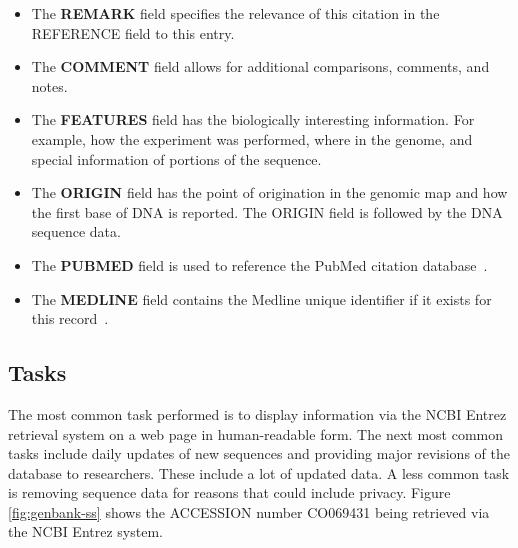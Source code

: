 \documentclass[12pt]{ucthesis}
\begin{document}
\begin{itemize}
\item The \textbf{REMARK} field specifies the relevance of this citation in the REFERENCE field to this entry.

\item The \textbf{COMMENT} field allows for additional comparisons, comments, and notes.

\item The \textbf{FEATURES} field has the biologically interesting information. For example, how the experiment was performed, where in the genome, and special information of portions of the sequence.

\item The \textbf{ORIGIN} field has the point of origination in the genomic map and how 
the first base of DNA is reported. The ORIGIN field is followed by the DNA sequence data.

\item The \textbf{PUBMED} field is used to reference the PubMed citation database~\cite{pubmed}.

\item The \textbf{MEDLINE} field contains the Medline unique identifier if it exists for this record~\cite{medline}.
\end{itemize}

\subsection{Tasks}
The most common task performed is to display information via the NCBI Entrez retrieval system on a web page in human-readable form. The next most common tasks include daily updates of new sequences and providing major revisions of the database to researchers. These include a lot of updated data. A less common task is removing sequence data for reasons that could include privacy. Figure \ref{fig:genbank-ss} shows the ACCESSION number
CO069431 being retrieved via the NCBI Entrez system.
\end{document}
